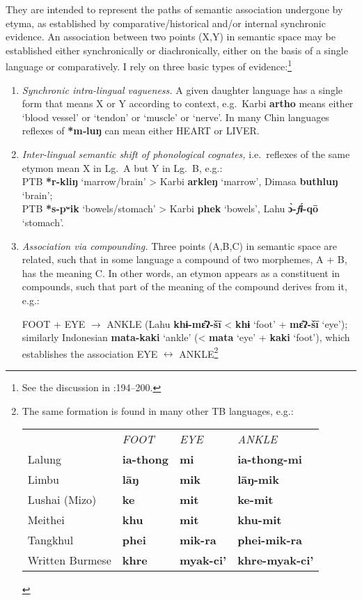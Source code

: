They are intended to represent the paths of semantic association undergone by etyma,
as established by comparative/historical and/or internal synchronic evidence. An
association between two points (X,Y) in semantic space may be established either
synchronically or diachronically, either on the basis of a single language or
comparatively. I rely on three basic types of evidence:\footnote{See the
discussion in \textit{}:194–200.}
\begin{enumerate}
\item
\textit{Synchronic intra-lingual vagueness.} A given daughter language has a single
form that means X or Y according to context, e.g.\ 
Karbi \textbf{artho} means either ‘blood vessel’ or ‘tendon’ or ‘muscle’ or ‘nerve’.
In many Chin languages reflexes of \textbf{*m‑luŋ} can mean either HEART or LIVER.
\item
\textit{Inter-lingual semantic shift of phonological cognates,} i.e.\ reflexes of the
same etymon mean X in Lg.~A but Y in Lg.~B, e.g.:\\
\hspace*{2ex}PTB \textbf{*r-kliŋ} ‘marrow/brain’ > Karbi \textbf{arkleŋ} ‘marrow’, Dimasa \textbf{buthluŋ} ‘brain’;\\
\hspace*{2ex}PTB \textbf{*s-pʷik} ‘bowels/stomach’ > Karbi \textbf{phek} ‘bowels’, Lahu \textbf{ɔ̀-\textit{fɨ́}-qō} ‘stomach’.
\item
\textit{Association via compounding.}  Three points (A,B,C) in semantic space are
related, such that in some language a compound of two morphemes, A + B, has the
meaning C. In other words, an etymon appears as a constituent in compounds,
such that part of the meaning of the compound derives from it, e.g.:

FOOT + EYE $\to$ ANKLE (Lahu \textbf{khɨ-mɛ̂ʔ-šī} < \textbf{khɨ} ‘foot’ + \textbf{mɛ̂ʔ-šī} ‘eye’);
similarly Indonesian \textbf{mata-kaki} ‘ankle’ (< \textbf{mata} ‘eye’ + \textbf{kaki} ‘foot’), which
establishes the association EYE $\longleftrightarrow$ ANKLE\footnote{The same formation is
found in many other TB languages, e.g.:

\begin{tabular}{llll}
				&\textit{FOOT}	&\textit{EYE}	&\textit{ANKLE}\\
Lalung			&\textbf{ia-thong}	&\textbf{mi}	&\textbf{ia-thong-mi}\\
Limbu			&\textbf{lāŋ}	&\textbf{mik}	&\textbf{lāŋ-mik}\\
Lushai (Mizo)			&\textbf{ke}		&\textbf{mit}	&\textbf{ke-mit}\\
Meithei			&\textbf{khu}	&\textbf{mit}	&\textbf{khu-mit}\\
Tangkhul		&\textbf{phei}	&\textbf{mik-ra}	&\textbf{phei-mik-ra}\\
Written Burmese	&\textbf{khre}	&\textbf{myak-ci'}	&\textbf{khre-myak-ci'}\\
\end{tabular}}
\end{enumerate}

